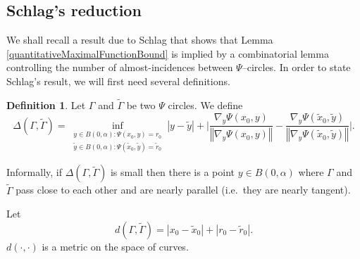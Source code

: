 \documentclass[reqno]{amsart}
\theoremstyle{definition}
\newtheorem{defn}[thm]{Definition}
\theoremstyle{remark}
\theoremstyle{remark}
\newcommand{\norm}[1]{\left\Vert#1\right\Vert}
\begin{document}
\subsection{Schlag's reduction}
We shall recall a result due to Schlag that shows that Lemma \ref{quantitativeMaximalFunctionBound} is implied by a combinatorial lemma controlling the number of almost-incidences between $\Psi$--circles. In order to state Schlag's result, we will first need several definitions.

\begin{defn}
Let $\Gamma$ and $\tilde\Gamma$ be two $\Psi$ circles. We define
\begin{equation}\label{defOfDeltaX}
\Delta(\Gamma,\tilde\Gamma)=\inf_{\substack{y\in B(0,\alpha)\colon \Psi(x_0,y)=r_0\\\tilde y\in B(0,\alpha)\colon\Psi(\tilde x_0,\tilde y)=\tilde r_0}} |y-\tilde y|+\Big|\frac{\nabla_y\Psi(x_0,y)}{\norm{\nabla_y\Psi(x_0,y)}}-\frac{\nabla_y\Psi(\tilde x_0,\tilde y)}{\norm{\nabla_y\Psi(\tilde x_0,\tilde y)}}\Big|.
\end{equation}
\end{defn}
Informally, if $\Delta(\Gamma,\tilde\Gamma)$ is small then there is a point $y\in B(0,\alpha)$ where $\Gamma$ and $\tilde\Gamma$ pass close to each other and are nearly parallel (i.e.~they are nearly tangent).

Let
\begin{equation}
d(\Gamma,\tilde\Gamma)=|x_0-\tilde x_0|+|r_0-\tilde r_0|.
\end{equation}
$d(\cdot,\cdot)$ is a metric on the space of curves.
\end{document}
